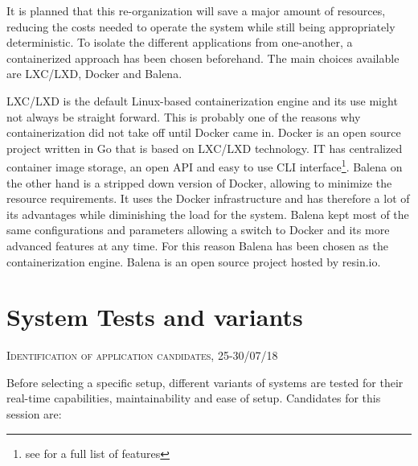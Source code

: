 \documentclass[]{scrartcl}
\begin{document}
It is planned that this re-organization will save a major amount of resources, reducing the costs needed to operate the system while still being appropriately deterministic. To isolate the different applications from one-another, a containerized approach has been chosen beforehand. The main choices available are LXC/LXD, Docker and Balena.

LXC/LXD is the default Linux-based containerization engine and its use might not always be straight forward. This is probably one of the reasons why containerization did not take off until Docker came in. Docker is an open source project written in Go that is based on LXC/LXD technology. IT has centralized container image storage, an open API and easy to use CLI interface\footnote{see \cite{docker01} for a full list of features}. Balena on the other hand is a stripped down version of Docker, allowing to minimize the resource requirements. It uses the Docker infrastructure and has therefore a lot of its advantages while diminishing the load for the system. Balena kept most of the same configurations and parameters allowing a switch to Docker and its more advanced features at any time. For this reason Balena has been chosen as the containerization engine. Balena is an open source project hosted by resin.io.
%

\section{System Tests and variants}

{\small\textsc{Identification of application candidates, 25-30/07/18} \bigskip}

Before selecting a specific setup, different variants of systems are tested for their real-time capabilities, maintainability and ease of setup. Candidates for this session are:
\end{document}
